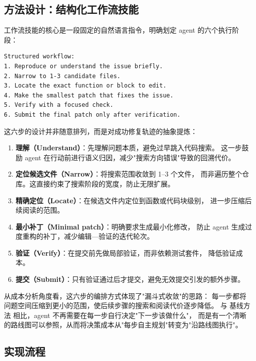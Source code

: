 \subsection{方法设计：结构化工作流技能}
\label{subsec:skill-abs-design}

工作流技能的核心是一段固定的自然语言指令，明确划定 agent 的六个执行阶段：
\begin{lstlisting}[style=promptstyle, caption={skill\_abstraction 注入的工作流提示（节选自 src/agent/task\_context.py）}, label={lst:skill-scaffold}]
Structured workflow:
1. Reproduce or understand the issue briefly.
2. Narrow to 1-3 candidate files.
3. Locate the exact function or block to edit.
4. Make the smallest patch that fixes the issue.
5. Verify with a focused check.
6. Submit the final patch only after verification.
\end{lstlisting}

这六步的设计并非随意排列，而是对成功修复轨迹的抽象提炼：

\begin{enumerate}
\item \textbf{理解（Understand）}：先理解问题本质，避免过早跳入代码搜索。
这一步鼓励 agent 在行动前进行语义归因，减少"搜索方向错误"导致的回溯代价。
\item \textbf{定位候选文件（Narrow）}：将搜索范围收敛到 1--3 个文件，
而非遍历整个仓库。这直接约束了搜索阶段的宽度，防止无限扩展。
\item \textbf{精确定位（Locate）}：在候选文件内定位到函数或代码块级别，
进一步压缩后续阅读的范围。
\item \textbf{最小补丁（Minimal patch）}：明确要求生成最小化修改，
防止 agent 生成过度重构的补丁，减少编辑—验证的迭代轮次。
\item \textbf{验证（Verify）}：在提交前先做局部验证，而非依赖测试套件，
降低验证成本。
\item \textbf{提交（Submit）}：只有验证通过后才提交，避免无效提交引发的额外步骤。
\end{enumerate}

从成本分析角度看，这六步的编排方式体现了"漏斗式收敛"的思路：
每一步都将问题空间压缩到更小的范围，使后续步骤的搜索和阅读代价逐步降低。
与 基线方法 相比，agent 不再需要在每一步自行决定"下一步该做什么"，
而是有一个清晰的路线图可以参照，从而将决策成本从"每步自主规划"转变为"沿路线图执行"。

\subsection{实现流程}

